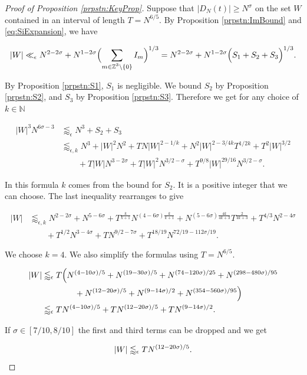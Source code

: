 \documentclass{amsart}
\theoremstyle{plain}
\numberwithin{equation}{section}
\begin{document}
\begin{proof}[Proof of Proposition \ref{prpstn:KeyProp}]

Suppose that $|D_N(t)| \ge N^\sigma$ on the set $W$ contained in an interval of length $T = N^{6/5}$.  By Proposition \ref{prpstn:ImBound} and \eqref{eq:SiExpansion}, we have

\[
|W|\ll_\epsilon N^{2-2\sigma}+N^{1-2\sigma}\Bigl(\sum_{\substack{m\in \mathbb{Z}^3\setminus\{0\}}}I_m\Bigr)^{1/3}=N^{2-2\sigma}+N^{1-2\sigma}\Bigl(S_1+S_2+S_3\Bigr)^{1/3}.
\]

By Proposition \ref{prpstn:S1}, $S_1$ is negligible. We bound $S_2$ by Proposition \ref{prpstn:S2}, and $S_3$ by Proposition \ref{prpstn:S3}. Therefore we get for any choice of $k\in\mathbb{N}$
 
\begin{align*}
|W|^3N^{6\sigma-3}&\lessapprox_\epsilon N^{3} +S_2+  S_3\\
&\lessapprox_{\epsilon,k} N^3+|W|^2N^2+T N |W|^{2-1/k}+N^2 |W|^{2-3/4k}T^{1/2k}+T^2 |W|^{3/2}\\
&\qquad+T |W| N^{3-2\sigma}+T |W|^2 N^{3/2-\sigma}+T^{9/8} |W|^{29/16} N^{3/2-\sigma}.
\end{align*}

In this formula $k$ comes from the bound for $S_2$.   It is a positive integer that we can choose.   The last inequality rearranges to give

\begin{align}
|W|&\lessapprox_{\epsilon,k} N^{2-2\sigma}+N^{5-6\sigma}+T^{\frac{k}{k+1}}N^{(4-6\sigma)\frac{k}{k+1}}+N^{(5-6\sigma)\frac{4k}{4k+3}}T^{\frac{2}{4k+3}}+T^{4/3}N^{2-4\sigma}\nonumber\\
&\qquad +T^{1/2}N^{3-4\sigma}+T N^{9/2-7\sigma}+T^{18/19}N^{72/19-112\sigma/19}.\label{eq:FullBound}
\end{align}

We choose $k=4$.  We also simplify the formulas using $T = N^{6/5}$.   

\begin{align*}
|W|&\lessapprox_{\epsilon} T\Bigl(N^{(4-10\sigma)/5}+N^{(19-30\sigma)/5}+N^{(74 - 120\sigma)/25}+N^{(298-480\sigma)/95}\\
&\qquad\qquad+N^{(12 - 20\sigma)/5}+N^{(9-14\sigma)/2}+N^{(354-560\sigma)/95}\Bigr)\\
&\lessapprox_{\epsilon} TN^{(4-10\sigma)/5}+TN^{(12-20\sigma)/5}+TN^{(9-14\sigma)/2}.
\end{align*}

If $\sigma\in[7/10,8/10]$ the first and third terms can be dropped and we get

\[ |W| \lessapprox_{\epsilon} T N^{(12 - 20 \sigma)/5}. \qedhere
\]

\end{proof}
\end{document}
